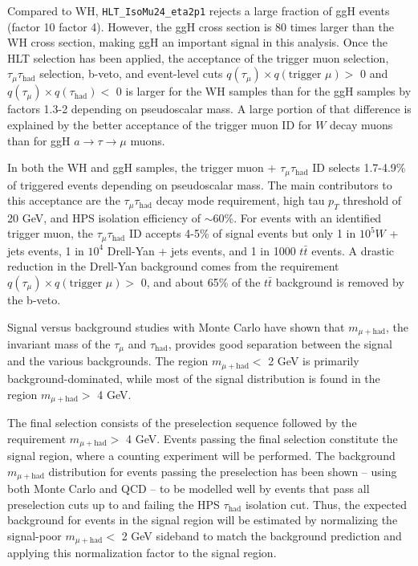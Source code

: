 Compared to WH, \texttt{HLT\_IsoMu24\_eta2p1} rejects a large fraction of ggH events (factor 10 \vs factor 4).  However, the ggH cross section is 80 times larger than the WH cross section, making ggH an important signal in this analysis.  Once the HLT selection has been applied, the acceptance of the trigger muon selection, $\tau_{\mu}\tau_{\text{had}}$ selection, b-veto, and event-level cuts $q(\tau_{\mu}) \times q(\text{trigger }\mu) >$ 0 and $q(\tau_{\mu}) \times q(\tau_{\text{had}}) <$ 0 is larger for the WH samples than for the ggH samples by factors 1.3-2 depending on pseudoscalar mass.  A large portion of that difference is explained by the better acceptance of the trigger muon ID for $W$ decay muons than for ggH $a\rightarrow\tau\rightarrow\mu$ muons.

In both the WH and ggH samples, the trigger muon + $\tau_{\mu}\tau_{\text{had}}$ ID selects 1.7-4.9\% of triggered events depending on pseudoscalar mass.  The main contributors to this acceptance are the $\tau_{\mu}\tau_{\text{had}}$ decay mode requirement, high tau $p_T$ threshold of 20 GeV, and HPS isolation efficiency of $\sim$60\%.  For events with an identified trigger muon, the $\tau_{\mu}\tau_{\text{had}}$ ID accepts 4-5\% of signal events but only 1 in $10^{5} W$ + jets events, 1 in $10^{4}$ Drell-Yan + jets events, and 1 in 1000 $t\bar{t}$ events.  A drastic reduction in the Drell-Yan background comes from the requirement $q(\tau_{\mu}) \times q(\text{trigger }\mu) >$ 0, and about 65\% of the $t\bar{t}$ background is removed by the b-veto.

Signal versus background studies with Monte Carlo have shown that $m_{\mu+\text{had}}$, the invariant mass of the $\tau_{\mu}$ and $\tau_{\text{had}}$, provides good separation between the signal and the various backgrounds. The region $m_{\mu+\text{had}} <$ 2 GeV is primarily background-dominated, while most of the signal distribution is found in the region $m_{\mu+\text{had}} >$ 4 GeV.

The final selection consists of the preselection sequence followed by the requirement $m_{\mu+\text{had}} >$ 4 GeV. Events passing the final selection constitute the signal region, where a counting experiment will be performed. The background $m_{\mu+\text{had}}$ distribution for events passing the preselection has been shown -- using both Monte Carlo and QCD -- to be modelled well by events that pass all preselection cuts up to and failing the HPS $\tau_{\text{had}}$ isolation cut. Thus, the expected background for events in the signal region will be estimated by normalizing the signal-poor $m_{\mu+\text{had}} <$ 2 GeV sideband to match the background prediction and applying this normalization factor to the signal region.
